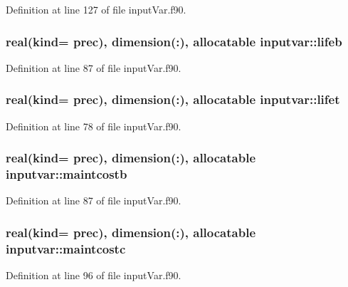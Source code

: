 Definition at line 127 of file input\-Var.\-f90.

\hypertarget{classinputvar_a74dcd10e62524e2f5145df13548eae82}{
\subsubsection[{lifeb}]{\setlength{\rightskip}{0pt plus 5cm}real(kind= prec), dimension(\-:), allocatable inputvar\-::lifeb}}\label{classinputvar_a74dcd10e62524e2f5145df13548eae82}


Definition at line 87 of file input\-Var.\-f90.

\hypertarget{classinputvar_a04abed47801bdfcda1ecba21b90ab85b}{
\subsubsection[{lifet}]{\setlength{\rightskip}{0pt plus 5cm}real(kind= prec), dimension(\-:), allocatable inputvar\-::lifet}}\label{classinputvar_a04abed47801bdfcda1ecba21b90ab85b}


Definition at line 78 of file input\-Var.\-f90.

\hypertarget{classinputvar_ac52f743f02f10e96c455d94c3cdc0fe8}{
\subsubsection[{maintcostb}]{\setlength{\rightskip}{0pt plus 5cm}real(kind= prec), dimension(\-:), allocatable inputvar\-::maintcostb}}\label{classinputvar_ac52f743f02f10e96c455d94c3cdc0fe8}


Definition at line 87 of file input\-Var.\-f90.

\hypertarget{classinputvar_a4371de15edf20ae9883b07b3b843655d}{
\subsubsection[{maintcostc}]{\setlength{\rightskip}{0pt plus 5cm}real(kind= prec), dimension(\-:), allocatable inputvar\-::maintcostc}}\label{classinputvar_a4371de15edf20ae9883b07b3b843655d}


Definition at line 96 of file input\-Var.\-f90.

